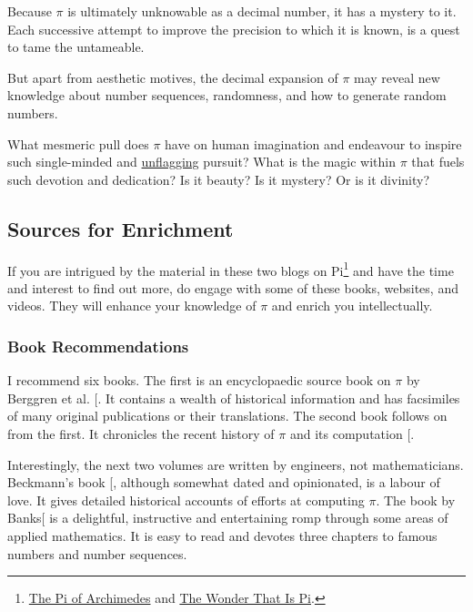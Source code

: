 \documentclass[
  a4paper,
]{article}
\begin{document}
Because \(\pi\) is ultimately unknowable as a decimal number, it has a
mystery to it. Each successive attempt to improve the precision to which
it is known, is a quest to tame the untameable.

But apart from aesthetic motives, the decimal expansion of \(\pi\) may
reveal new knowledge about number sequences, randomness, and how to
generate random numbers.

What mesmeric pull does \(\pi\) have on human imagination and endeavour
to inspire such single-minded and
\href{https://www.vocabulary.com/dictionary/unflagging}{unflagging}
pursuit? What is the magic within \(\pi\) that fuels such devotion and
dedication? Is it beauty? Is it mystery? Or is it divinity?

\subsection{Sources for Enrichment}\label{sources-for-enrichment}

If you are intrigued by the material in these two blogs on Pi\footnote{\href{https://swanlotus.netlify.app/blogs/the-pi-of-archimedes}{The
  Pi of Archimedes} and
  \href{https://swanlotus.netlify.app/blogs/the-wonder-that-is-pi}{The
  Wonder That Is Pi}.} and have the time and interest to find out more,
do engage with some of these books, websites, and videos. They will
enhance your knowledge of \(\pi\) and enrich you intellectually.

\subsubsection{Book Recommendations}\label{book-recommendations}

I recommend six books. The first is an encyclopaedic source book on
\(\pi\) by Berggren et al. {[}\citeproc{ref-pi-source}{32}{]}. It
contains a wealth of historical information and has facsimiles of many
original publications or their translations. The second book follows on
from the first. It chronicles the recent history of \(\pi\) and its
computation {[}\citeproc{ref-pi-next-gen-2016}{44}{]}.

Interestingly, the next two volumes are written by engineers, not
mathematicians. Beckmann's book {[}\citeproc{ref-beckmann-1971}{24}{]},
although somewhat dated and opinionated, is a labour of love. It gives
detailed historical accounts of efforts at computing \(\pi\). The book
by Banks{[}\citeproc{ref-banks-1999}{47}{]} is a delightful, instructive
and entertaining romp through some areas of applied mathematics. It is
easy to read and devotes three chapters to famous numbers and number
sequences.
\end{document}

